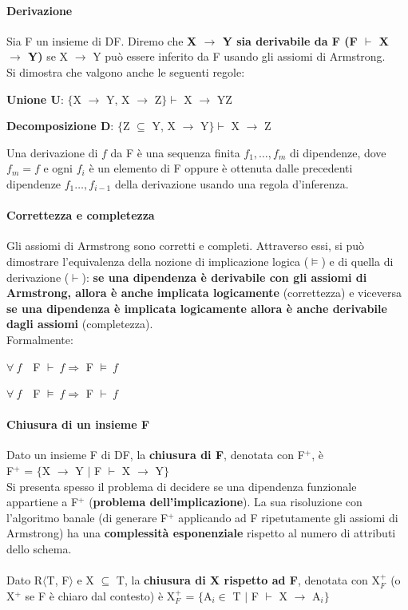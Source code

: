 \documentclass[10pt]{book}
\begin{document}
\paragraph{Derivazione} Sia F un insieme di DF. Diremo che \textbf{X $\rightarrow$ Y sia derivabile da F (F $\vdash$ X $\rightarrow$ Y)} se X $\rightarrow$ Y può essere inferito da F usando gli assiomi di Armstrong.\\
Si dimostra che valgono anche le seguenti regole:
\begin{list}{}{}
	\item \textbf{Unione U}: $\{$X $\rightarrow$ Y, X $\rightarrow$ Z$\}\vdash$ X $\rightarrow$ YZ
	\item \textbf{Decomposizione D}: $\{$Z $\subseteq$ Y, X $\rightarrow$ Y$\}\vdash$ X $\rightarrow$ Z
\end{list}
Una derivazione di $f$ da F è una sequenza finita $f_1,\ldots,f_m$ di dipendenze, dove $f_m = f$ e ogni $f_i$ è un elemento di F oppure è ottenuta dalle precedenti dipendenze $f_1\ldots,f_{i-1}$ della derivazione usando una regola d'inferenza.
\paragraph{Correttezza e completezza} Gli assiomi di Armstrong sono corretti e completi. Attraverso essi, si può dimostrare l'equivalenza della nozione di implicazione logica ($\vDash$) e di quella di derivazione ($\vdash$): \textbf{se una dipendenza è derivabile con gli assiomi di Armstrong, allora è anche implicata logicamente} (correttezza) e viceversa \textbf{se una dipendenza è implicata logicamente allora è anche derivabile dagli assiomi} (completezza).\\
Formalmente:
\begin{list}{}{}
	\item $\forall\:f\:\:\:$ F $\vdash\:f\Rightarrow$ F $\vDash\:f$
	\item $\forall\:f\:\:\:$ F $\vDash\:f\Rightarrow$ F $\vdash\:f$
\end{list}
\paragraph{Chiusura di un insieme F} Dato un insieme F di DF, la \textbf{chiusura di F}, denotata con F$^+$, è\\F$^+$ = $\{$X $\rightarrow$ Y $|$ F $\vdash$ X $\rightarrow$ Y$\}$\\
Si presenta spesso il problema di decidere se una dipendenza funzionale appartiene a F$^+$ (\textbf{problema dell'implicazione}). La sua risoluzione con l'algoritmo banale (di generare F$^+$ applicando ad F ripetutamente gli assiomi di Armstrong) ha una \textbf{complessità esponenziale} rispetto al numero di attributi dello schema.\\\\
Dato R$\langle$T, F$\rangle$ e X $\subseteq$ T, la \textbf{chiusura di X rispetto ad F}, denotata con X$_F^+$ (o X$^+$ se F è chiaro dal contesto) è X$_F^+$ = $\{$A$_i\in$ T $|$ F $\vdash$ X $\rightarrow$ A$_i\}$
\end{document}
